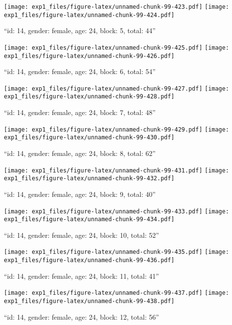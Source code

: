 \documentclass[,]{article}
\begin{document}
\texttt{[image: exp1\_files/figure-latex/unnamed-chunk-99-423.pdf]}
\texttt{[image: exp1\_files/figure-latex/unnamed-chunk-99-424.pdf]}

\newpage
[1] 

``id: 14, gender: female, age: 24, block: 5, total: 44''

\texttt{[image: exp1\_files/figure-latex/unnamed-chunk-99-425.pdf]}
\texttt{[image: exp1\_files/figure-latex/unnamed-chunk-99-426.pdf]}

\newpage
[1] 

``id: 14, gender: female, age: 24, block: 6, total: 54''

\texttt{[image: exp1\_files/figure-latex/unnamed-chunk-99-427.pdf]}
\texttt{[image: exp1\_files/figure-latex/unnamed-chunk-99-428.pdf]}

\newpage
[1] 

``id: 14, gender: female, age: 24, block: 7, total: 48''

\texttt{[image: exp1\_files/figure-latex/unnamed-chunk-99-429.pdf]}
\texttt{[image: exp1\_files/figure-latex/unnamed-chunk-99-430.pdf]}

\newpage
[1] 

``id: 14, gender: female, age: 24, block: 8, total: 62''

\texttt{[image: exp1\_files/figure-latex/unnamed-chunk-99-431.pdf]}
\texttt{[image: exp1\_files/figure-latex/unnamed-chunk-99-432.pdf]}

\newpage
[1] 

``id: 14, gender: female, age: 24, block: 9, total: 40''

\texttt{[image: exp1\_files/figure-latex/unnamed-chunk-99-433.pdf]}
\texttt{[image: exp1\_files/figure-latex/unnamed-chunk-99-434.pdf]}

\newpage
[1] 

``id: 14, gender: female, age: 24, block: 10, total: 52''

\texttt{[image: exp1\_files/figure-latex/unnamed-chunk-99-435.pdf]}
\texttt{[image: exp1\_files/figure-latex/unnamed-chunk-99-436.pdf]}

\newpage
[1] 

``id: 14, gender: female, age: 24, block: 11, total: 41''

\texttt{[image: exp1\_files/figure-latex/unnamed-chunk-99-437.pdf]}
\texttt{[image: exp1\_files/figure-latex/unnamed-chunk-99-438.pdf]}

\newpage
[1] 

``id: 14, gender: female, age: 24, block: 12, total: 56''
\end{document}
